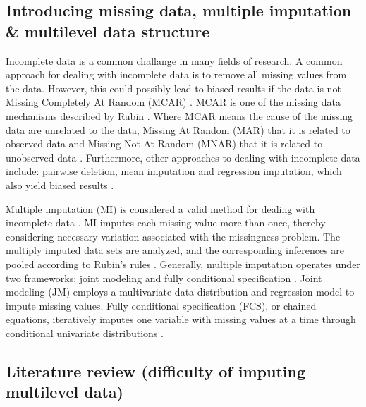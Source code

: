 \documentclass[10pt, a4paper, titlepage]{article}
\begin{document}
\subsection{Introducing missing data, multiple imputation \& multilevel data structure}
Incomplete data is a common challange in many fields of research. A common approach for dealing with incomplete data is to remove all missing values from the data. However, this could possibly lead to biased results if the data is not Missing Completely At Random (MCAR) \cite{buurenFlexibleImputationMissing2018, kang2013, enders2017, austin2021}. MCAR is one of the missing data mechanisms described by Rubin \cite{rubin1976}. Where MCAR means the cause of the missing data are unrelated to the data, Missing At Random (MAR) that it is related to observed data and Missing Not At Random (MNAR) that it is related to unobserved data \cite{buurenFlexibleImputationMissing2018, rubin1976}. Furthermore, other approaches to dealing with incomplete data include: pairwise deletion, mean imputation and regression imputation, which also yield biased results \cite{buurenFlexibleImputationMissing2018}.

Multiple imputation (MI) is considered a valid method for dealing with incomplete data \cite{mistlerComparisonJointModel2017, buurenFlexibleImputationMissing2018, enders2017, burgette2010, austin2021, audigier2018, vanbuuren2007, grund2021, hughes2014}. MI imputes each missing value more than once, thereby considering necessary variation associated with the missingness problem. The multiply imputed data sets are analyzed, and the corresponding inferences are pooled according to Rubin's rules \cite{buurenFlexibleImputationMissing2018, austin2021, rubin1987}.
Generally, multiple imputation operates under two frameworks: joint modeling and fully conditional specification \cite{mistlerComparisonJointModel2017, buurenFlexibleImputationMissing2018, enders2018, enders2018a, hughes2014}. Joint modeling (JM) employs a multivariate data distribution and regression model to impute missing values. Fully conditional specification (FCS), or chained equations, iteratively imputes one variable with missing values at a time through conditional univariate distributions \cite{mistlerComparisonJointModel2017, buurenFlexibleImputationMissing2018, enders2018, enders2018a, hughes2014}.

\subsection{Literature review (difficulty of imputing multilevel data)}
\end{document}

